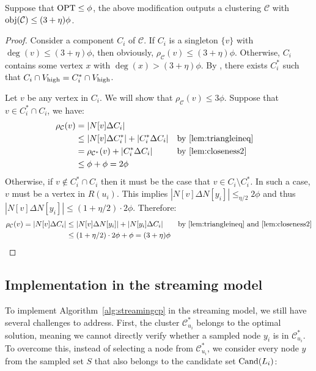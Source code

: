 \begin{theorem} Suppose that $\mathrm{OPT} \leq \phi$, the above modification outputs a clustering $\mathcal{C}$ with $\mathrm{obj}(\mathcal{C})\leq (3+\eta) \phi$.  \end{theorem}
\begin{proof}
Consider a component $C_i$ of $\mathcal{C}$. If $C_i$ is a singleton $\{v\}$ with $\deg(v) \leq (3+\eta)\phi$, then obviously, $\rho_{\mathcal{C}}(v) \leq (3+\eta)\phi$. Otherwise, $C_i$ contains some vertex $x$ with $\deg(x) >  (3+\eta)\phi$. By , there exists $C^{*}_i$ such that $C_i \cap V_{\operatorname{high}} = {C}^{*}_{i} \cap V_{\operatorname{high}}$.

Let $v$ be any vertex in $C_i$. We will show that $\rho_{\mathcal{C}}(v) \leq 3\phi$. Suppose that $v \in C^{*}_i \cap C_i$, we have: 
\begin{align*}
\rho_{\mathcal{C}}(v) &= |N[v] \Delta C_i|\\
&\leq |N[v] \Delta C^{*}_i | + |C^{*}_i \Delta C_i|  && \mbox{by \Cref{lem:triangleineq}}\\
&= \rho_{\mathcal{C^{*}}}(v) + |C^{*}_i \Delta C_i| && \mbox{by \Cref{lem:closeness2}}\\
&\leq \phi + \phi  = 2\phi
\end{align*}
Otherwise, if $v \notin C^{*}_i \cap C_i$ then it must be the case that $v \in C_i \setminus C^{*}_i$. In such a case, $v$ must be a vertex in $R(u_i)$. This implies $|N[v] \Delta N[y_i]| \leq_{\eta/2} 2\phi$ and thus $|N[v] \Delta N[y_i]| \leq (1+\eta/2)\cdot2\phi$. Therefore:
\begin{align*}
\rho_{\mathcal{C}}(v) = |N[v] \Delta C_i| 
&\leq |N[v] \Delta N[y_i]| + |N[y_i] \Delta C_i| && \mbox{by \Cref{lem:triangleineq} and \Cref{lem:closeness2}} \\
&\leq (1+\eta/2)\cdot 2\phi + \phi = (3+\eta)\phi
\end{align*}
\end{proof}

\subsection{Implementation in the streaming model}
\label{sec:streamingimplementation}

To implement Algorithm~\ref{alg:streamingcp} in the streaming model, we still have several challenges to address. First, the cluster $\mathcal{C}^*_{u_i}$ belongs to the optimal solution, meaning we cannot directly verify whether a sampled node $y_i$ is in $\mathcal{C}^*_{u_i}$. To overcome this, instead of selecting a node from $\mathcal{C}^*_{u_i}$, we consider every node $y$ from the sampled set $S$ that also belongs to the candidate set $\mathrm{Cand}(L_i)$:

